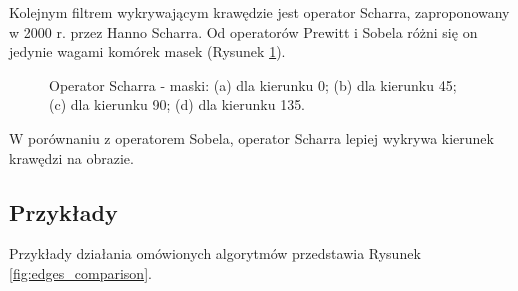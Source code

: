 \documentclass[a4paper,twocolumn,12pt]{article}
\begin{document}
Kolejnym filtrem wykrywającym krawędzie jest operator Scharra, zaproponowany w 2000 r. przez Hanno Scharra.
Od operatorów Prewitt i Sobela różni się on jedynie wagami komórek masek (Rysunek \ref{fig:scharr_matrices}).

\begin{figure}[!ht]
 \begin{center}
 \end{center}
 \caption{
  Operator Scharra - maski:
  (a) dla kierunku 0\textdegree;
  (b) dla kierunku 45\textdegree;
  (c) dla kierunku 90\textdegree;
  (d) dla kierunku 135\textdegree.
 }
 \label{fig:scharr_matrices}
\end{figure}

W porównaniu z operatorem Sobela, operator Scharra lepiej wykrywa kierunek krawędzi na obrazie.


\subsection{Przykłady}

Przykłady działania omówionych algorytmów przedstawia Rysunek \ref{fig:edges_comparison}.
\end{document}
